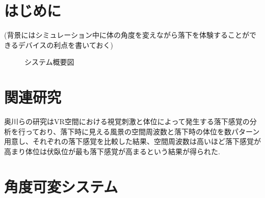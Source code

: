 \documentclass[uplatex]{jsarticle}
\begin{document}
\vspace{3mm}

\setcounter{page}{9}

\section{はじめに}
(背景にはシミュレーション中に体の角度を変えながら落下を体験することができるデバイスの利点を書いておく)

\begin{figure}[tb]
  \centering
  \caption{システム概要図}
  \label{fig:about_system}

\end{figure}

\section{関連研究}
奥川らの研究\cite{spatial_stimulation_effect_falling}はVR空間における視覚刺激と体位によって発生する落下感覚の分析を行っており、落下時に見える風景の空間周波数と落下時の体位を数パターン用意し、それぞれの落下感覚を比較した結果、空間周波数は高いほど落下感覚が高まり体位は伏臥位が最も落下感覚が高まるという結果が得られた.



\section{角度可変システム}
\end{document}
